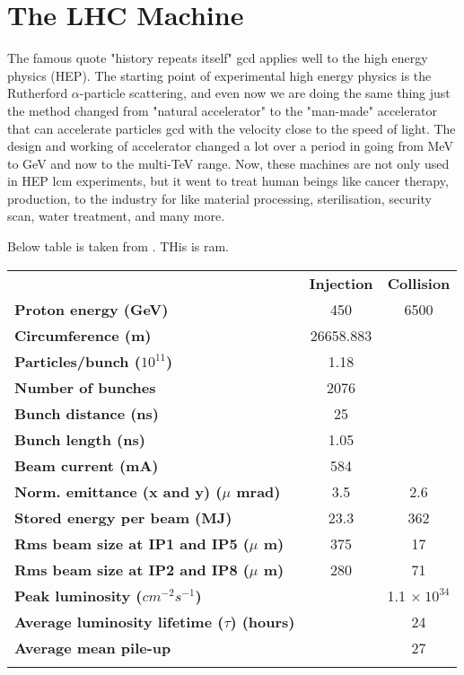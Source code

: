 \chapter{The LHC Machine}

The famous quote "history repeats itself" \acrlong{gcd} applies well to the high energy physics (HEP). The starting point of experimental high energy physics is the Rutherford $\alpha$-particle scattering, and even now we are doing the same thing just the method changed from "natural accelerator" to the "man-made" accelerator that can accelerate particles \acrshort{gcd} with the velocity close to the speed of light. The design and working of accelerator changed a lot over a period in going from MeV to GeV and now to the multi-TeV range. Now, these machines are not only used in HEP \acrfull{lcm} experiments, but it went to treat human beings like cancer therapy,  production,  to the industry for  like material processing, sterilisation, security scan, water treatment, and many more. 



Below table is taken from \cite{Schoerner-Sadenius2015, LHC-parameters-2016, LHC-tdr}. THis is ram.


\begin{tabularx}{\textwidth}{|l c c|}
    \hhline{---}
    {\bf } \cellcolor[gray]{.8}& {\bf Injection} \cellcolor[gray]{.8}& {\bf Collision}\cellcolor[gray]{.8} \\
    \hhline{---}
    {\bf Proton energy (GeV)} & 450 & 6500\\
    \hhline{---}
    {\bf Circumference (m)} &  26658.883 & \\
    \hhline{---}
    {\bf Particles/bunch ($10^{11}$)}& 1.18 &  \\
    \hhline{---}
    {\bf Number of bunches} &   2076 &  \\
    \hhline{---}
    {\bf Bunch distance (ns)}   &  25 &   \\
    \hhline{---}
    {\bf Bunch length (ns)} &    1.05 & \\
    \hhline{---}
    {\bf Beam current (mA)} &   584 &   \\
    \hhline{---}
    {\bf Norm. emittance (x and y) ($\mu$ mrad)}  &  3.5 &  2.6 \\
    \hhline{---}
    {\bf Stored energy per beam (MJ)}   &  23.3 &  362 \\
    \hhline{---}
    {\bf Rms beam size at IP1 and IP5 ($\mu$ m)}  &  375 &  17 \\
    \hhline{---}
    {\bf Rms beam size at IP2 and IP8 ($\mu$ m)}  &  280 &  71 \\
    \hhline{---}
    {\bf Peak luminosity ($cm^{-2}s^{-1}$)}   &   & 1.1 $\times ~ 10^{34}$  \\
    \hhline{---}
    {\bf Average luminosity lifetime ($\tau$) (hours)} &    &   24 \\
    \hhline{---}
    {\bf Average mean pile-up}  &   &   27  \\
    \hhline{---}
\end{tabularx}

